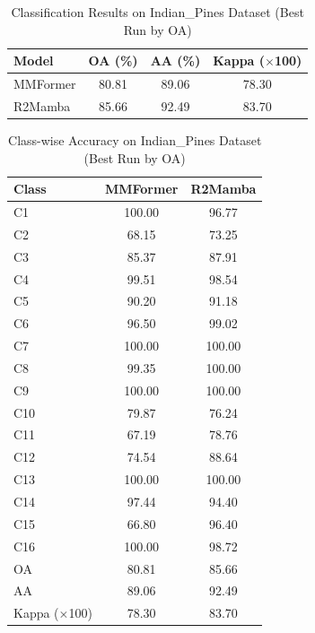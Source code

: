 
\begin{table}[htbp]
\centering
\caption{Classification Results on Indian\_Pines Dataset (Best Run by OA)}
\label{tab:indian_pines_results_arranged}
\begin{tabular}{lccc}
\toprule
Model & OA (\%) & AA (\%) & Kappa ($\times$100) \\
\midrule
MMFormer & 80.81 & 89.06 & 78.30 \\
R2Mamba & 85.66 & 92.49 & 83.70 \\
\bottomrule
\end{tabular}
\end{table}

\begin{table}[htbp]
\centering
\caption{Class-wise Accuracy on Indian\_Pines Dataset (Best Run by OA)}
\label{tab:indian_pines_classwise_arranged}
\begin{tabular}{lcc}
\toprule
Class & MMFormer & R2Mamba \\
\midrule
C1 & 100.00 & 96.77 \\
C2 & 68.15 & 73.25 \\
C3 & 85.37 & 87.91 \\
C4 & 99.51 & 98.54 \\
C5 & 90.20 & 91.18 \\
C6 & 96.50 & 99.02 \\
C7 & 100.00 & 100.00 \\
C8 & 99.35 & 100.00 \\
C9 & 100.00 & 100.00 \\
C10 & 79.87 & 76.24 \\
C11 & 67.19 & 78.76 \\
C12 & 74.54 & 88.64 \\
C13 & 100.00 & 100.00 \\
C14 & 97.44 & 94.40 \\
C15 & 66.80 & 96.40 \\
C16 & 100.00 & 98.72 \\
\midrule
OA & 80.81 & 85.66 \\
AA & 89.06 & 92.49 \\
Kappa ($\times$100) & 78.30 & 83.70 \\
\bottomrule
\end{tabular}
\end{table}
